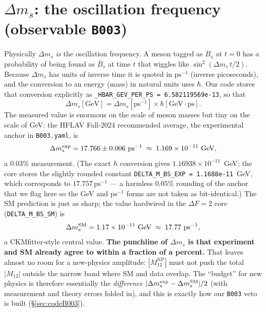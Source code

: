 \documentclass[11pt]{article}
\newcommand{\code}[1]{\texttt{#1}}
\newcommand{\Bs}{B_s}
\newcommand{\Bsbar}{\bar B_s}
\newcommand{\dms}{\Delta m_s}
\newcommand{\Mtwelve}{M_{12}}
\newcommand{\MtwelveNP}{M_{12}^{\mathrm{NP}}}
\theoremstyle{definition}
\begin{document}
\section{$\dms$: the oscillation frequency (observable \code{B003})}
\label{sec:dms}

Physically $\dms$ \emph{is} the oscillation frequency. A meson tagged as $\Bs$ at
$t=0$ has a probability of being found as $\Bsbar$ at time $t$ that wiggles like
$\sin^2(\dms\, t/2)$. Because $\dms$ has units of inverse time it is quoted in
$\mathrm{ps}^{-1}$ (inverse picoseconds), and the conversion to an energy
(mass) in natural units uses $\hbar$. Our code stores that conversion explicitly
as \code{\_HBAR\_GEV\_PER\_PS = 6.582119569e-13}, so that
\begin{equation}
\dms[\text{GeV}] = \dms[\text{ps}^{-1}]\times \hbar[\text{GeV}\cdot\text{ps}].
\end{equation}
The measured value is enormous on the scale of meson masses but tiny on the scale
of GeV: the HFLAV Fall-2024 recommended average, the experimental anchor in
\code{B003.yaml}, is
\begin{equation}
\dms^{\rm exp} = 17.766 \pm 0.006\ \mathrm{ps}^{-1}
\;\approx\; 1.169\times10^{-11}\ \text{GeV},
\label{eq:dmsexp}
\end{equation}
a $0.03\%$ measurement. (The exact $\hbar$ conversion gives
$1.16938\times10^{-11}$~GeV; the core stores the slightly rounded constant
\code{DELTA\_M\_BS\_EXP = 1.1688e-11}~GeV, which corresponds to
$17.757\,\mathrm{ps}^{-1}$ --- a harmless $0.05\%$ rounding of the anchor that we
flag here so the GeV and $\mathrm{ps}^{-1}$ forms are not taken as bit-identical.) The SM prediction is just as sharp; the value hardwired
in the $\Delta F=2$ core (\code{DELTA\_M\_BS\_SM}) is
\begin{equation}
\dms^{\rm SM} = 1.17\times10^{-11}\ \text{GeV}
\;\approx\; 17.77\ \mathrm{ps}^{-1},
\label{eq:dmssm}
\end{equation}
a CKMfitter-style central value. \textbf{The punchline of $\dms$ is that
experiment and SM already agree to within a fraction of a percent.} That leaves
almost no room for a new-physics amplitude: $|\MtwelveNP|$ must not push the
total $|\Mtwelve|$ outside the narrow band where SM and data overlap. The
``budget'' for new physics is therefore essentially the \emph{difference}
$|\dms^{\rm exp}-\dms^{\rm SM}|/2$ (with measurement and theory errors folded in),
and this is exactly how our \code{B003} veto is built (\S\ref{sec:codeB003}).
\end{document}
